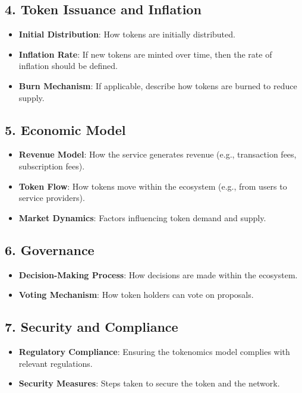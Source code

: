 \documentclass{tufte-handout}
\begin{document}
\subsection*{4. Token Issuance and Inflation}
\begin{itemize}
    \item \textbf{Initial Distribution}: How tokens are initially distributed.
    \item \textbf{Inflation Rate}: If new tokens are minted over time, then the rate of inflation should be defined.
    \item \textbf{Burn Mechanism}: If applicable, describe how tokens are burned to reduce supply.
\end{itemize}

\subsection*{5. Economic Model}
\begin{itemize}
    \item \textbf{Revenue Model}: How the service generates revenue (e.g., transaction fees, subscription fees).
    \item \textbf{Token Flow}: How tokens move within the ecosystem (e.g., from users to service providers).
    \item \textbf{Market Dynamics}: Factors influencing token demand and supply.
\end{itemize}

\subsection*{6. Governance}
\begin{itemize}
    \item \textbf{Decision-Making Process}: How decisions are made within the ecosystem.
    \item \textbf{Voting Mechanism}: How token holders can vote on proposals.
\end{itemize}

\subsection*{7. Security and Compliance}
\begin{itemize}
    \item \textbf{Regulatory Compliance}: Ensuring the tokenomics model complies with relevant regulations.
    \item \textbf{Security Measures}: Steps taken to secure the token and the network.
\end{itemize}
\end{document}
